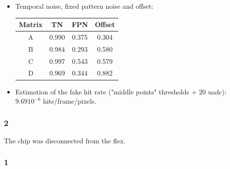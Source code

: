 \documentclass[a4papper, 10pt]{article}
\begin{document}
\begin{itemize}
    \item Temporal noise, fixed pattern noise and offset:

            \begin{center}
              \begin{tabular}{ c c c c }
                \hline %
         \rowcolor{light-gray}         Matrix  &  TN   &  FPN  &  Offset  \tabularnewline
                \hline %
                \hline %
                    A     & 0.990 & 0.375 &  0.304    \tabularnewline
                \hline %
                    B     & 0.984 & 0.293 & 0.580   \tabularnewline
                \hline %
                    C     & 0.997 & 0.543 & 0.579   \tabularnewline
                \hline %
                    D     & 0.969 & 0.344 &  0.882    \tabularnewline
                \hline %
              \end{tabular}
            \end{center}
    
    \item Estimation of the fake hit rate ("middle points" thresholds + 20 uadc): $9.69 10^{-6}$ hits/frame/pixels. 
    
    \end{itemize}

    \subsubsection{2}

    The chip was disconnected from the flex.

    \subsubsection{1}
\end{document}
